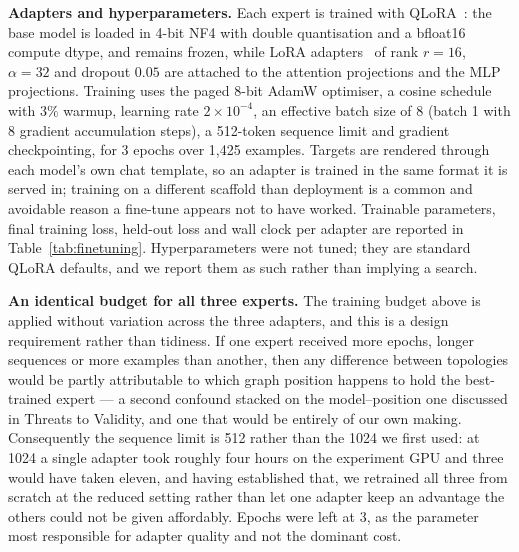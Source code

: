 \documentclass[journal,10pt,compsoc,onecolumn]{IEEEtran}
\begin{document}
\textbf{Adapters and hyperparameters.} Each expert is trained with
QLoRA~\cite{dettmers2023qlora}: the base model is loaded in 4-bit NF4 with
double quantisation and a bfloat16 compute dtype, and remains frozen, while LoRA
adapters~\cite{hu2021lora} of rank $r=16$, $\alpha=32$ and dropout $0.05$ are
attached to the attention projections and the MLP projections. Training uses the
paged 8-bit AdamW optimiser, a cosine schedule with $3\%$ warmup, learning rate
$2\times 10^{-4}$, an effective batch size of 8 (batch 1 with 8 gradient
accumulation steps), a 512-token sequence limit and gradient checkpointing, for
3 epochs over 1{,}425 examples. Targets are rendered through each model's own
chat template, so an adapter is trained in the same format it is served in;
training on a different scaffold than deployment is a common and avoidable reason
a fine-tune appears not to have worked. Trainable parameters, final training
loss, held-out loss and wall clock per adapter are reported in
Table~\ref{tab:finetuning}. Hyperparameters were not tuned; they are standard
QLoRA defaults, and we report them as such rather than implying a search.

\textbf{An identical budget for all three experts.} The training budget above is
applied without variation across the three adapters, and this is a design
requirement rather than tidiness. If one expert received more epochs, longer
sequences or more examples than another, then any difference between topologies
would be partly attributable to which graph position happens to hold the
best-trained expert --- a second confound stacked on the model--position one
discussed in Threats to Validity, and one that would be entirely of our own
making. Consequently the sequence limit is 512 rather than the 1024 we first
used: at 1024 a single adapter took roughly four hours on the experiment GPU and
three would have taken eleven, and having established that, we retrained all
three from scratch at the reduced setting rather than let one adapter keep an
advantage the others could not be given affordably. Epochs were left at 3, as the
parameter most responsible for adapter quality and not the dominant cost.
\end{document}
